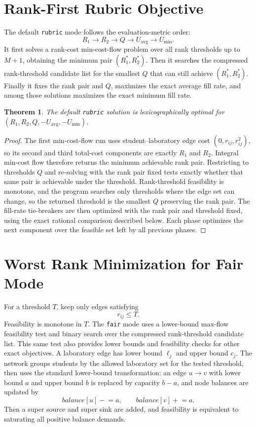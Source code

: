 \documentclass[11pt,a4paper]{article}
\newtheorem{theorem}{Theorem}
\begin{document}
\section{Rank-First Rubric Objective}

The default \texttt{rubric} mode follows the evaluation-metric order:
\[
  R_1 \rightarrow R_2 \rightarrow Q
  \rightarrow U_{\mathrm{avg}} \rightarrow U_{\min}.
\]
It first solves a rank-cost min-cost-flow problem over all rank thresholds up
to \(M+1\), obtaining the minimum pair \((R_1^*,R_2^*)\).  Then it searches the
compressed rank-threshold candidate list for the smallest \(Q\) that can still
achieve \((R_1^*,R_2^*)\).  Finally it fixes the rank pair and \(Q\), maximizes
the exact average fill rate, and among those solutions maximizes the exact
minimum fill rate.

\begin{theorem}
The default \texttt{rubric} solution is lexicographically optimal for
\((R_1,R_2,Q,-U_{\mathrm{avg}},-U_{\min})\).
\end{theorem}

\begin{proof}
The first min-cost-flow run uses student--laboratory edge cost
\((0,r_{ij},r_{ij}^2)\), so its second and third total-cost components are
exactly \(R_1\) and \(R_2\).  Integral min-cost flow therefore returns the
minimum achievable rank pair.  Restricting to thresholds \(Q\) and re-solving
with the rank pair fixed tests exactly whether that same pair is achievable
under the threshold.  Rank-threshold feasibility is monotone, and the program
searches only thresholds where the edge set can change, so the returned
threshold is the smallest \(Q\) preserving the rank pair.  The fill-rate
tie-breakers are then optimized with the rank pair and threshold fixed, using
the exact rational comparison described below.  Each phase optimizes the next
component over the feasible set left by all previous phases.
\end{proof}

\section{Worst Rank Minimization for Fair Mode}

For a threshold \(T\), keep only edges satisfying
\[
  r_{ij} \leq T.
\]
Feasibility is monotone in \(T\).  The \texttt{fair} mode uses a lower-bound
max-flow feasibility test and binary search over the compressed rank-threshold
candidate list.  This same test also provides lower bounds and feasibility
checks for other exact objectives.  A laboratory edge has lower bound
\(\ell_j\) and upper bound \(c_j\).  The
network groups students by the allowed laboratory set for the tested
threshold, then uses the standard lower-bound transformation:
an edge \(u\to v\) with lower bound \(a\) and upper bound \(b\) is replaced by
capacity \(b-a\), and node balances are updated by
\[
  balance[u] \mathrel{-}= a,\qquad balance[v] \mathrel{+}= a.
\]
Then a super source and super sink are added, and feasibility is equivalent to
saturating all positive balance demands.
\end{document}
